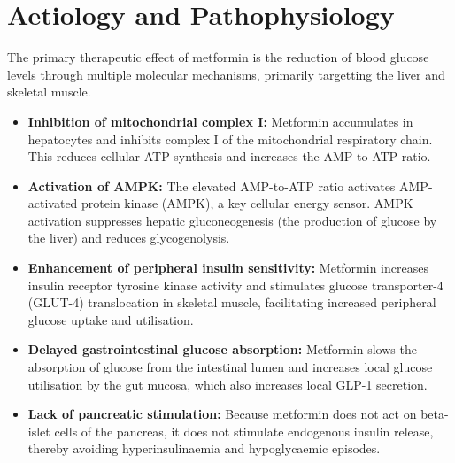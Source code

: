 \section*{Aetiology and Pathophysiology}
The primary therapeutic effect of metformin is the reduction of blood glucose levels through multiple molecular mechanisms, primarily targetting the liver and skeletal muscle.
\begin{itemize}
    \item \textbf{Inhibition of mitochondrial complex I:} Metformin accumulates in hepatocytes and inhibits complex I of the mitochondrial respiratory chain. This reduces cellular ATP synthesis and increases the AMP-to-ATP ratio.
    \item \textbf{Activation of AMPK:} The elevated AMP-to-ATP ratio activates AMP-activated protein kinase (AMPK), a key cellular energy sensor. AMPK activation suppresses hepatic gluconeogenesis (the production of glucose by the liver) and reduces glycogenolysis.
    \item \textbf{Enhancement of peripheral insulin sensitivity:} Metformin increases insulin receptor tyrosine kinase activity and stimulates glucose transporter-4 (GLUT-4) translocation in skeletal muscle, facilitating increased peripheral glucose uptake and utilisation.
    \item \textbf{Delayed gastrointestinal glucose absorption:} Metformin slows the absorption of glucose from the intestinal lumen and increases local glucose utilisation by the gut mucosa, which also increases local GLP-1 secretion.
    \item \textbf{Lack of pancreatic stimulation:} Because metformin does not act on beta-islet cells of the pancreas, it does not stimulate endogenous insulin release, thereby avoiding hyperinsulinaemia and hypoglycaemic episodes.
\end{itemize}

